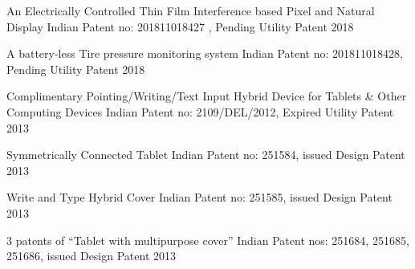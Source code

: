 

\begin{cvhonors}

  \cvhonor
{An Electrically Controlled Thin Film Interference based Pixel and Natural Display} %
{Indian Patent no: 201811018427 , Pending} %
{Utility Patent} %
{2018} %


  \cvhonor
{A battery-less Tire pressure monitoring system} %
{Indian Patent no: 201811018428, Pending} %
{Utility Patent} %
{2018} %

  \cvhonor
    {Complimentary Pointing/Writing/Text Input Hybrid Device for Tablets \& Other Computing Devices} %
    {Indian Patent no: 2109/DEL/2012, Expired} %
    {Utility Patent} %
    {2013} %


  \cvhonor
    {Symmetrically Connected Tablet} %
    {Indian Patent no: 251584, issued} %
    {Design Patent} %
    {2013} %

  \cvhonor
    {Write and Type Hybrid Cover} %
    {Indian Patent no: 251585, issued} %
    {Design Patent} %
    {2013} %

    
  \cvhonor
    {3 patents of ``Tablet with multipurpose cover''} %
    {Indian Patent nos: 251684, 251685, 251686, issued}   %
    {Design Patent} %
    {2013} %

\end{cvhonors}
